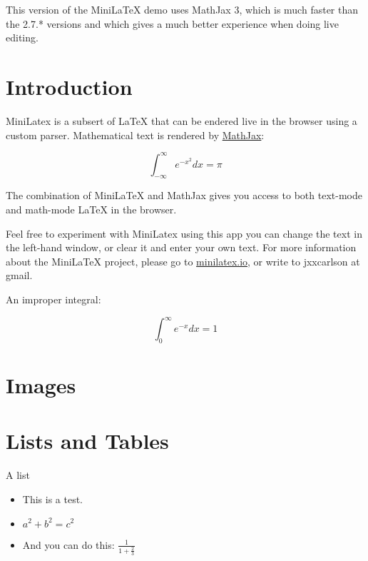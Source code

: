 
 This version of the MiniLaTeX
demo uses MathJax 3, which is much faster than
the 2.7.* versions and which gives a much better
experience when doing live editing.

\section{Introduction}

MiniLatex is a subsert
of LaTeX that can
be endered live in the browser using a custom parser.
Mathematical text is rendered by
 \href{https://mathjax.org}{MathJax}:

$$
\int_{-\infty}^\infty e^{-x^2} dx = \pi
$$

The combination of MiniLaTeX and MathJax
gives you access to both text-mode
and math-mode LaTeX in the browser.


Feel free to
experiment with MiniLatex using this app
\mdash you can change the text in the
left-hand window, or clear it and enter
your own text. For more information about
the MiniLaTeX project, please go to
\href{https://minilatex.io}{minilatex.io},
or write to jxxcarlson at gmail.


An improper integral:

\begin{equation}
\label{integral:exp}
\int_0^\infty e^{-x} dx = 1
\end{equation}


\section{Images}


\section{Lists and Tables}

A list

\begin{itemize}

\item This is  a test.

\item {} $a^2 + b^2 = c^2$

\item And you can do this:
$ \frac{1}{1 + \frac{2}{3}} $

\end{itemize}


